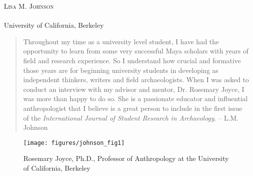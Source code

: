 \openingarticle
\def\ppages{\pagerange{Johnson:firstpage}{Johnson:lastpage}}
\def\shorttitle{Interview: Rosemary Joyce}
\def\shortauthor{Lisa M. Johnson}
\def\authormail{llomitola@berkeley.edu}
\def\maintitle{Rosemary Joyce, Ph.D. \textit{Professor of Anthropology at the University of California, Berkeley}}
\def\affiliation{University of California, Berkeley}
\begin{center}
	{\Large\scshape\shortauthor}\\[1em]
	\email \\
	\affiliation
\end{center}
\vspace{3em}
\midarticle
 \label{Johnson:firstpage}
 	

\blockquote{Throughout my time as a university level student, I have had the opportunity to learn from some very successful Maya scholars with years of field and research experience.  So I understand how crucial and formative those years are for beginning university students in developing as independent thinkers, writers and field archaeologists.  When I was asked to conduct an interview with my advisor and mentor, Dr. Rosemary Joyce, I was more than happy to do so.  She is a passionate educator and influential anthropologist that I believe is a great person to include in the first issue of the \emph{International Journal of Student Research in Archaeology}. -- L.M. Johnson}	
	
	\begin{figure}
		\texttt{[image: figures/johnson\_fig1]}
		\centering
		\caption{Rosemary Joyce, Ph.D., Professor of Anthropology at the University of California, Berkeley}
		\label{fig:Johnson:Fig1}
	\end{figure}
	
